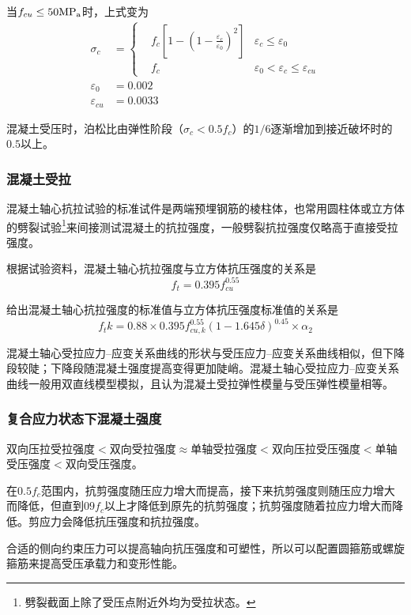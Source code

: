 \documentclass{article}
\begin{document}
\par 当$f_{cu} \leq 50\rm{MP_a}$时，上式变为
\begin{align*}
      \sigma_c         & =
      \left\{ \begin{aligned}
                     & f_c[1-(1-\frac{\varepsilon_c}{\varepsilon_0})^2] & \varepsilon_c \leq \varepsilon_0                    \\
                     & f_c                                              & \varepsilon_0 < \varepsilon_c \leq \varepsilon_{cu}
              \end{aligned} \right. \\
      \varepsilon_0    & =0.002                                                                                         \\
      \varepsilon_{cu} & =0.0033
\end{align*}
\par 混凝土受压时，泊松比由弹性阶段（$\sigma_c<0.5f_c$）的$1/6$逐渐增加到接近破坏时的$0.5$以上。
\subsubsection{混凝土受拉}
\par 混凝土轴心抗拉试验的标准试件是两端预埋钢筋的棱柱体，也常用圆柱体或立方体的劈裂试验\footnote{劈裂截面上除了受压点附近外均为受拉状态。}来间接测试混凝土的抗拉强度，一般劈裂抗拉强度仅略高于直接受拉强度。
\par 根据试验资料，混凝土轴心抗拉强度与立方体抗压强度的关系是
$$
      f_t = 0.395 f_{cu}^{0.55}
$$
\par \gb{}给出混凝土轴心抗拉强度的标准值与立方体抗压强度标准值的关系是
$$
      f_tk = 0.88 \times 0.395 f_{cu,k}^{0.55} (1-1.645\delta)^{0.45}\times \alpha_2
$$
\par 混凝土轴心受拉应力--应变关系曲线的形状与受压应力--应变关系曲线相似，但下降段较陡；下降段随混凝土强度提高变得更加陡峭。混凝土轴心受拉应力--应变关系曲线一般用双直线模型模拟，且认为混凝土受拉弹性模量与受压弹性模量相等。
\subsubsection{复合应力状态下混凝土强度}
\par 双向压拉受拉强度$<$双向受拉强度$\approx$单轴受拉强度$<$双向压拉受压强度$<$单轴受压强度$<$双向受压强度。
\par 在$0.5f_c$范围内，抗剪强度随压应力增大而提高，接下来抗剪强度则随压应力增大而降低，但直到$09f_c$以上才降低到原先的抗剪强度；抗剪强度随着拉应力增大而降低。剪应力会降低抗压强度和抗拉强度。
\par 合适的侧向约束压力可以提高轴向抗压强度和可塑性，所以可以配置圆箍筋或螺旋箍筋来提高受压承载力和变形性能。
\end{document}
